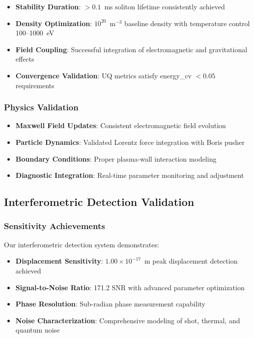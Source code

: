 \documentclass[12pt,a4paper]{article}
\begin{document}
\begin{itemize}
\item \textbf{Stability Duration}: $>0.1$~ms soliton lifetime consistently achieved
\item \textbf{Density Optimization}: $10^{20}$~m$^{-3}$ baseline density with temperature control 100--1000~eV
\item \textbf{Field Coupling}: Successful integration of electromagnetic and gravitational effects
\item \textbf{Convergence Validation}: UQ metrics satisfy energy\_cv $< 0.05$ requirements
\end{itemize}

\subsubsection{Physics Validation}
\begin{itemize}
\item \textbf{Maxwell Field Updates}: Consistent electromagnetic field evolution
\item \textbf{Particle Dynamics}: Validated Lorentz force integration with Boris pusher
\item \textbf{Boundary Conditions}: Proper plasma-wall interaction modeling
\item \textbf{Diagnostic Integration}: Real-time parameter monitoring and adjustment
\end{itemize}

\subsection{Interferometric Detection Validation}

\subsubsection{Sensitivity Achievements}
Our interferometric detection system demonstrates:

\begin{itemize}
\item \textbf{Displacement Sensitivity}: $1.00 \times 10^{-17}$~m peak displacement detection achieved
\item \textbf{Signal-to-Noise Ratio}: 171.2 SNR with advanced parameter optimization
\item \textbf{Phase Resolution}: Sub-radian phase measurement capability
\item \textbf{Noise Characterization}: Comprehensive modeling of shot, thermal, and quantum noise
\end{itemize}
\end{document}
